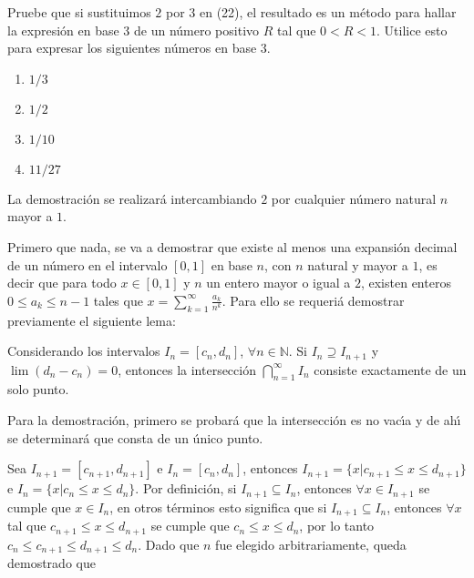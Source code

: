 \begin{enunciado}
 Pruebe que si sustituimos $2$ por $3$ en (22), el resultado es un m\'etodo para hallar la expresi\'on en base $3$ de un n\'umero positivo $R$ tal que $0 < R < 1$. Utilice esto para expresar los siguientes n\'umeros en base $3$.
 \begin{multicols}{4}
  \begin{enumerate}
   \item $1/3$
   \item $1/2$
   \item $1/10$
   \item $11/27$
  \end{enumerate}
 \end{multicols}
\end{enunciado}

\begin{solucion}
 La demostraci\'on se realizar\'a intercambiando $2$ por cualquier n\'umero natural $n$ mayor a $1$.
 \par 
 Primero que nada, se va a demostrar que existe al menos una expansi\'on decimal de un n\'umero en el intervalo $[0,1]$ en base $n$, con $n$ natural y mayor a $1$, es decir que para todo $x\in[0,1]$ y $n$ un entero mayor o igual a $2$, existen enteros $0\leq a_{k} \leq n-1$ tales que $x = \sum_{k=1}^{\infty} \frac{a_k}{n^k}$.
 Para ello se requeri\'a demostrar previamente el siguiente lema:
 \begin{lema}
  Considerando los intervalos $I_n = [c_n, d_n]$, $\forall n \in \mathbb{N}$. Si $I_n \supseteq I_{n+1}$ y $\lim (d_n - c_n) = 0$, entonces la intersecci\'on $\bigcap_{n=1}^{\infty} I_n$ consiste exactamente de un solo punto.
 \end{lema}
 \begin{demostracion}
  Para la demostraci\'on, primero se probar\'a que la intersecci\'on es no vac\'{\i}a y de ah\'{\i} se determinar\'a que consta de un \'unico punto. 
  \par 
  Sea $I_{n+1} = [c_{n+1}, d_{n+1}]$ e $I_{n} = [c_{n}, d_{n}]$, entonces $I_{n+1} = \{ x| c_{n+1} \leq x \leq d_{n+1} \}$ e $I_{n} = \{ x| c_n \leq x \leq d_n \}$. Por definici\'on, si $I_{n+1} \subseteq I_n$, entonces $\forall x \in I_{n+1}$ se cumple que $x\in I_n$, en otros t\'erminos esto significa que si $I_{n+1} \subseteq I_n$, entonces $\forall x$ tal que $c_{n+1} \leq x \leq d_{n+1}$ se cumple que $c_{n} \leq x \leq d_{n}$, por lo tanto $c_{n} \leq c_{n+1} \leq d_{n+1} \leq d_{n}$. Dado que $n$ fue elegido arbitrariamente, queda demostrado que
  \begin{equation} \label{resLema1}

\end{equation}
\end{demostracion}
\end{solucion}
